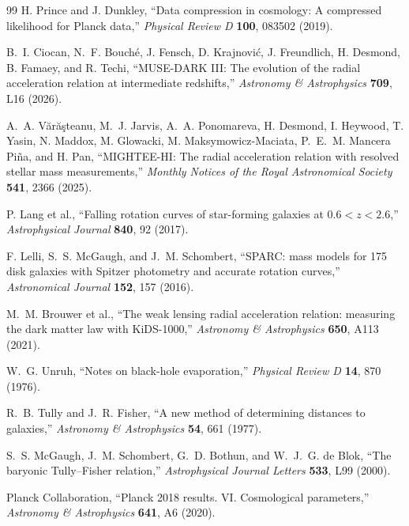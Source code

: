 \documentclass[11pt]{article}
\begin{document}
\begin{thebibliography}{99}
H. Prince and J. Dunkley,
``Data compression in cosmology: A compressed likelihood for Planck data,''
\emph{Physical Review D} \textbf{100}, 083502 (2019).

B.~I. Ciocan, N.~F. Bouch\'e, J. Fensch, D. Krajnovi\'c, J. Freundlich, H. Desmond, B. Famaey, and R. Techi,
``MUSE-DARK III: The evolution of the radial acceleration relation at intermediate redshifts,''
\emph{Astronomy \& Astrophysics} \textbf{709}, L16 (2026).

A.~A. V\u{a}r\u{a}\c{s}teanu, M.~J. Jarvis, A.~A. Ponomareva, H. Desmond, I. Heywood, T. Yasin, N. Maddox, M. Glowacki, M. Maksymowicz-Maciata, P.~E.~M. Mancera Pi\~na, and H. Pan,
``MIGHTEE-HI: The radial acceleration relation with resolved stellar mass measurements,''
\emph{Monthly Notices of the Royal Astronomical Society} \textbf{541}, 2366 (2025).

P. Lang et al.,
``Falling rotation curves of star-forming galaxies at $0.6<z<2.6$,''
\emph{Astrophysical Journal} \textbf{840}, 92 (2017).

F. Lelli, S.~S. McGaugh, and J.~M. Schombert,
``SPARC: mass models for 175 disk galaxies with Spitzer photometry and accurate rotation curves,''
\emph{Astronomical Journal} \textbf{152}, 157 (2016).

M.~M. Brouwer et al.,
``The weak lensing radial acceleration relation: measuring the dark matter law with KiDS-1000,''
\emph{Astronomy \& Astrophysics} \textbf{650}, A113 (2021).

W.~G. Unruh,
``Notes on black-hole evaporation,''
\emph{Physical Review D} \textbf{14}, 870 (1976).

R.~B. Tully and J.~R. Fisher,
``A new method of determining distances to galaxies,''
\emph{Astronomy \& Astrophysics} \textbf{54}, 661 (1977).

S.~S. McGaugh, J.~M. Schombert, G.~D. Bothun, and W.~J.~G. de Blok,
``The baryonic Tully--Fisher relation,''
\emph{Astrophysical Journal Letters} \textbf{533}, L99 (2000).

Planck Collaboration,
``Planck 2018 results. VI. Cosmological parameters,''
\emph{Astronomy \& Astrophysics} \textbf{641}, A6 (2020).


\end{thebibliography}
\end{document}
